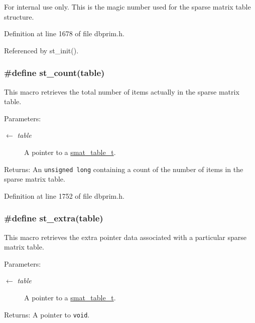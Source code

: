 \begin{Desc}
\item[For internal use only.]
This is the magic number used for the sparse matrix table structure.\end{Desc}


Definition at line 1678 of file dbprim.h.

Referenced by st\_\-init().\hypertarget{group__dbprim__smat_ga38}{
\subsubsection[st\_\-count]{\setlength{\rightskip}{0pt plus 5cm}\#define st\_\-count(table)}}
\label{group__dbprim__smat_ga38}


This macro retrieves the total number of items actually in the sparse matrix table.

\begin{Desc}
\item[Parameters:]
\begin{description}
\item[\mbox{$\leftarrow$} {\em table}]A pointer to a \hyperlink{group__dbprim__smat_ga0}{smat\_\-table\_\-t}.\end{description}
\end{Desc}
\begin{Desc}
\item[Returns:]An {\tt unsigned long} containing a count of the number of items in the sparse matrix table.\end{Desc}


Definition at line 1752 of file dbprim.h.\hypertarget{group__dbprim__smat_ga39}{
\subsubsection[st\_\-extra]{\setlength{\rightskip}{0pt plus 5cm}\#define st\_\-extra(table)}}
\label{group__dbprim__smat_ga39}


This macro retrieves the extra pointer data associated with a particular sparse matrix table.

\begin{Desc}
\item[Parameters:]
\begin{description}
\item[\mbox{$\leftarrow$} {\em table}]A pointer to a \hyperlink{group__dbprim__smat_ga0}{smat\_\-table\_\-t}.\end{description}
\end{Desc}
\begin{Desc}
\item[Returns:]A pointer to {\tt void}.\end{Desc}


